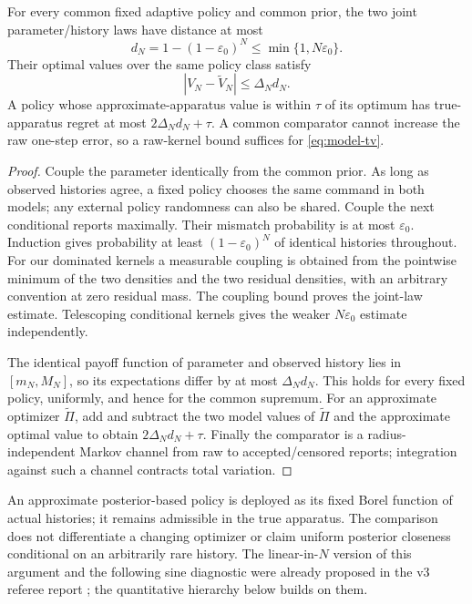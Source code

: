 \begin{theorem}\label{thm:model-error}
For every common fixed adaptive policy and common prior, the two joint parameter/history laws have distance at most
\[
 d_N=1-(1-\varepsilon_0)^N\le\min\{1,N\varepsilon_0\}.
\]
Their optimal values over the same policy class satisfy
\begin{equation}
 |V_N-\widetilde V_N|\le\Delta_N d_N.
 \label{eq:model-value}
\end{equation}
A policy whose approximate-apparatus value is within $\tau$ of its optimum has true-apparatus regret at most $2\Delta_Nd_N+\tau$. A common comparator cannot increase the raw one-step error, so a raw-kernel bound suffices for \eqref{eq:model-tv}.
\end{theorem}
\begin{proof}
Couple the parameter identically from the common prior. As long as observed histories agree, a fixed policy chooses the same command in both models; any external policy randomness can also be shared. Couple the next conditional reports maximally. Their mismatch probability is at most $\varepsilon_0$. Induction gives probability at least $(1-\varepsilon_0)^N$ of identical histories throughout. For our dominated kernels a measurable coupling is obtained from the pointwise minimum of the two densities and the two residual densities, with an arbitrary convention at zero residual mass. The coupling bound proves the joint-law estimate. Telescoping conditional kernels gives the weaker $N\varepsilon_0$ estimate independently.

The identical payoff function of parameter and observed history lies in $[m_N,M_N]$, so its expectations differ by at most $\Delta_Nd_N$. This holds for every fixed policy, uniformly, and hence for the common supremum. For an approximate optimizer $\widetilde\Pi$, add and subtract the two model values of $\widetilde\Pi$ and the approximate optimal value to obtain $2\Delta_Nd_N+\tau$. Finally the comparator is a radius-independent Markov channel from raw to accepted/censored reports; integration against such a channel contracts total variation.
\end{proof}

An approximate posterior-based policy is deployed as its fixed Borel function of actual histories; it remains admissible in the true apparatus. The comparison does not differentiate a changing optimizer or claim uniform posterior closeness conditional on an arbitrarily rare history. The linear-in-$N$ version of this argument and the following sine diagnostic were already proposed in the v3 referee report \cite{RefereeV3}; the quantitative hierarchy below builds on them.

